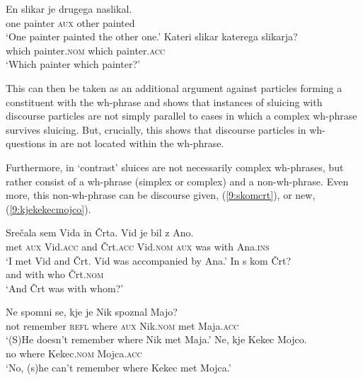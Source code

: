 \documentclass[output=paper,modfonts,newtxmath,hidelinks]{langscibook}
\begin{document}
\begin{exe}
\ex \begin{xlist}
\ex \gll En slikar je drugega naslikal.\\
one painter \textsc{aux} other 	painted\\
\trans `One painter painted the other one.'	 
\ex \label{9:katerikaterega}
\gll	Kateri slikar katerega slikarja?\\
which painter.\textsc{nom} which painter.\textsc{acc}\\
\trans `Which painter which painter?'
\end{xlist}\end{exe}

\noindent This can then be taken as an additional argument against particles forming a constituent with the wh-phrase and shows that instances of sluicing with  discourse particles are not simply parallel to cases in which a complex wh-phrase survives sluicing. But, crucially, this shows that discourse particles in wh-questions in  are not located within the wh-phrase. 

Furthermore, in  `contrast' sluices are not necessarily complex wh-phrases, but rather consist of a wh-phrase (simplex or complex) and a non-wh-phrase. Even more, this non-wh-phrase can be discourse given, (\ref{9:skomcrt}), or new, (\ref{9:kjekekecmojco}).

\begin{exe}
\ex \begin{xlist}
\ex \gll Srečala sem Vida in Črta. Vid je bil z Ano.\\
met \textsc{aux} Vid.\textsc{acc} and Črt.\textsc{acc}  Vid.\textsc{nom} \textsc{aux} was with Ana.\textsc{ins} \\
\trans `I met Vid and Črt. Vid was accompanied by Ana.' 
\ex \gll In s kom Črt? \\
	and with who Črt.\textsc{nom}\\
\trans  `And Črt was with whom?'
\end{xlist}
\label{9:skomcrt}
\ex \begin{xlist}
\ex \gll	Ne spomni se, kje je Nik spoznal Majo? \\
not remember \textsc{refl} where \textsc{aux} Nik.\textsc{nom} met Maja.\textsc{acc}\\
\trans `(S)He doesn't remember where Nik met Maja.'
\ex \gll 	Ne, kje Kekec Mojco.\\
	no where Kekec.\textsc{nom} Mojca.\textsc{acc}\\
\trans 	 `No, (s)he can't remember where Kekec met Mojca.'
\end{xlist}
\label{9:kjekekecmojco}
\end{exe}
\end{document}
